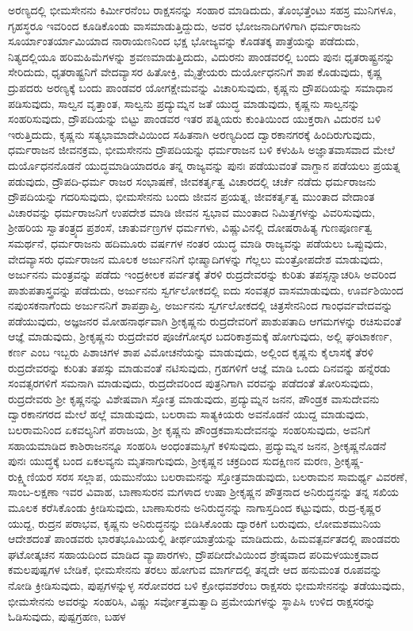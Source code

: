 ಅರಣ್ಯದಲ್ಲಿ ಭೀಮಸೇನನು ಕಿರ್ಮೀರನೆಂಬ ರಾಕ್ಷಸನನ್ನು ಸಂಹಾರ ಮಾಡಿದುದು, ತೊಂಭತ್ತೆಂಟು ಸಹಸ್ರ ಮುನಿಗಳೂ, ಗೃಹಸ್ಥರೂ ಇವರಿಂದ ಕೂಡಿಕೊಂಡು ವಾಸಮಾಡು\-ತ್ತಿದ್ದುದು, ಅವರ ಭೋಜನಾದಿಗಳಿಗಾಗಿ ಧರ್ಮರಾಜನು ಸೂರ್ಯಾಂತರ್ಯಾಮಿಯಾದ ನಾರಾಯಣನಿಂದ ಭಕ್ಷ ಭೋಜ್ಯವನ್ನು ಕೊಡತಕ್ಕ ಪಾತ್ರೆಯನ್ನು ಪಡೆದುದು, ನಿತ್ಯದಲ್ಲಿಯೂ ಹರಿಮಹಿಮೆಗಳನ್ನು ಶ್ರವಣಮಾಡುತ್ತಿದುದು, ವಿದುರನು ಪಾಂಡವರಲ್ಲಿ ಬಂದು ಪುನಃ ಧೃತರಾಷ್ಟ್ರನನ್ನು ಸೇರಿದುದು, ಧೃತರಾಷ್ಟ್ರನಿಗೆ ವೇದವ್ಯಾಸರ ಹಿತೋಕ್ತಿ, ಮೈತ್ರೇಯರು ದುರ್ಯೋಧನನಿಗೆ ಶಾಪ ಕೊಡುವುದು, ಕೃಷ್ಣ ದ್ರುಪದರು ಅರಣ್ಯಕ್ಕೆ ಬಂದು ಪಾಂಡವರ ಯೋಗಕ್ಷೇಮವನ್ನು ವಿಚಾರಿಸುವುದು, ಕೃಷ್ಣನು ದ್ರೌಪದಿಯನ್ನು ಸಮಾಧಾನ ಪಡಿಸುವುದು, ಸಾಲ್ವನ ವೃತ್ತಾಂತ, ಸಾಲ್ವನು ಪ್ರದ್ಯುಮ್ನನ ಜತೆ ಯುದ್ಧ ಮಾಡುವುದು, ಕೃಷ್ಣನು ಸಾಲ್ವನನ್ನು ಸಂಹರಿಸುವುದು, ದ್ರೌಪದಿಯನ್ನು ಬಿಟ್ಟು ಪಾಂಡವರ ಇತರ ಪತ್ನಿಯರು ಕುಂತಿಯಿಂದ ಯುಕ್ತರಾಗಿ ವಿದುರನ ಬಳಿ ಇರುತ್ತಿದುದು, ಕೃಷ್ಣನು ಸತ್ಯಭಾಮಾದೇವಿಯಿಂದ ಸಹಿತನಾಗಿ ಅರಣ್ಯದಿಂದ ದ್ವಾರಕಾನಗರಕ್ಕೆ ಹಿಂದಿರುಗುವುದು, ಧರ್ಮರಾಜನ ಜೀವನಕ್ರಮ, ಭೀಮಸೇನನು ದ್ರೌಪದಿಯನ್ನು ಧರ್ಮರಾಜನ ಬಳಿ ಕಳುಹಿಸಿ ಅಜ್ಞಾತವಾಸವಾದ ಮೇಲೆ ದುರ್ಯೊಧನನೊಡನೆ ಯುದ್ಧಮಾಡಿಯಾದರೂ ತನ್ನ ರಾಜ್ಯವನ್ನು ಪುನಃ ಪಡೆಯುವಂತೆ ವಾಗ್ದಾನ ಪಡೆಯಲು ಪ್ರಯತ್ನ ಪಡುವುದು, ದ್ರೌಪದಿ-ಧರ್ಮ ರಾಜರ ಸಂಭಾಷಣೆ, ಜೀವಕರ್ತೃತ್ವ ವಿಚಾರದಲ್ಲಿ ಚರ್ಚೆ ನಡೆದು ಧರ್ಮರಾಜನು ದ್ರೌಪದಿಯನ್ನು ಗದರಿಸುವುದು, ಭೀಮಸೇನನು ಬಂದು ಜೀವನ ಪ್ರಯತ್ನ, ಜೀವಕರ್ತೃತ್ವ ಮುಂತಾದ ವೇದಾಂತ ವಿಚಾರವನ್ನು ಧರ್ಮರಾಜನಿಗೆ ಉಪದೇಶ ಮಾಡಿ ಜೀವನ ಸ್ವಭಾವ ಮುಂತಾದ ನಿಮಿತ್ತಗಳನ್ನು ವಿವರಿಸುವುದು, ಶ‍್ರೀಹರಿಯ ಸ್ವಾತಂತ್ರ್ಯದ ಪ್ರಶಂಸೆ, ಚಾತುರ್ವಣ್ರಗಳ ಧರ್ಮಗಳು, ವಿಷ್ಣುವಿನಲ್ಲಿ ದೋಷರಾಹಿತ್ಯ ಗುಣಪೂರ್ಣತ್ವ ಸಮರ್ಥನೆ, ಧರ್ಮರಾಜನು ಹದಿಮೂರು ವರ್ಷಗಳ ನಂತರ ಯುದ್ಧ ಮಾಡಿ ರಾಜ್ಯವನ್ನು ಪಡೆಯಲು ಒಪ್ಪುವುದು, ವೇದವ್ಯಾಸರು ಧರ್ಮರಾಜನ ಮೂಲಕ ಅರ್ಜುನನಿಗೆ ಭೀಷ್ಮಾದಿಗಳನ್ನು ಗೆಲ್ಲಲು ಮಂತ್ರೋಪದೇಶ ಮಾಡುವುದು, ಅರ್ಜುನನು ಮಂತ್ರವನ್ನು ಪಡೆದು ಇಂದ್ರಕೀಲಕ ಪರ್ವತಕ್ಕೆ ತೆರಳಿ ರುದ್ರದೇವರನ್ನು ಕುರಿತು ತಪಸ್ಸನ್ನಾಚರಿಸಿ ಅವರಿಂದ ಪಾಶುಪತಾಸ್ತ್ರವನ್ನು ಪಡೆದುದು, ಅರ್ಜುನನು ಸ್ವರ್ಗಲೋಕದಲ್ಲಿ ಐದು ಸಂವತ್ಸರ ವಾಸಮಾಡುವುದು, ಊರ್ವಶಿಯಿಂದ ನಪುಂಸಕನಾಗೆಂದು ಅರ್ಜುನನಿಗೆ ಶಾಪಪ್ರಾಪ್ತಿ, ಅರ್ಜುನನು ಸ್ವರ್ಗಲೋಕದಲ್ಲಿ ಚಿತ್ರಸೇನನಿಂದ ಗಾಂಧರ್ವವೇದವನ್ನು ಪಡೆಯುವುದು, ಅಜ್ಞಜನರ ಮೋಹನಾರ್ಥವಾಗಿ ಶ‍್ರೀಕೃಷ್ಣನು ರುದ್ರದೇವರಿಗೆ ಪಾಶುಪತಾದಿ ಆಗಮಗಳನ್ನು ರಚಿಸುವಂತೆ ಆಜ್ಞೆ ಮಾಡುವುದು, ಶ‍್ರೀಕೃಷ್ಣನು ರುದ್ರದೇವರ ಪೂಜೆಗೋಸ್ಕರ ಬದರಿಕಾಶ್ರಮಕ್ಕೆ ಹೋಗುವುದು, ಅಲ್ಲಿ ಘಂಟಾಕರ್ಣ, ಕರ್ಣ ಎಂಬ ಇಬ್ಬರು ಪಿಶಾಚಿಗಳ ಶಾಪ ವಿಮೋಚನೆಯನ್ನು ಮಾಡುವುದು, ಅಲ್ಲಿಂದ ಕೃಷ್ಣನು ಕೈಲಾಸಕ್ಕೆ ತೆರಳಿ ರುದ್ರದೇವರನ್ನು ಕುರಿತು ತಪಸ್ಸು ಮಾಡುವಂತೆ ನಟಿಸುವುದು, ಗ್ರಹಗಳಿಗೆ ಆಜ್ಞೆ ಮಾಡಿ ಒಂದು ದಿನವನ್ನು ಹನ್ನೆರಡು ಸಂವತ್ಸರಗಳಿಗೆ ಸಮನಾಗಿ ಮಾಡುವುದು, ರುದ್ರದೇವರಿಂದ ಪುತ್ರನಿಗಾಗಿ ವರವನ್ನು ಪಡೆದಂತೆ ತೋರಿಸುವುದು, ರುದ್ರದೇವರು ಶ‍್ರೀ ಕೃಷ್ಣನನ್ನು ವಿಶೇಷವಾಗಿ ಸ್ತೋತ್ರ ಮಾಡುವುದು, ಪ್ರದ್ಯುಮ್ನನ ಜನನ, ಪೌಂಡ್ರಕ ವಾಸುದೇವನು ದ್ವಾರಕಾನಗರದ ಮೇಲೆ ಹಲ್ಲೆ ಮಾಡುವುದು, ಬಲರಾಮ ಸಾತ್ಯಕಿಯರು ಅವನೊಡನೆ ಯುದ್ದ ಮಾಡುವುದು, ಬಲರಾಮನಿಂದ ಏಕವಲ್ಯನಿಗೆ ಪರಾಜಯ, ಶ‍್ರೀ ಕೃಷ್ಣನು ಪೌಂಡ್ರಕವಾಸುದೇವನನ್ನು ಸಂಹರಿಸುವುದು, ಅವನಿಗೆ ಸಹಾಯಮಾಡಿದ ಕಾಶಿರಾಜನನ್ನೂ ಸಂಹರಿಸಿ ಅಂಧಂತಮಸ್ಸಿಗೆ ಕಳಿಸುವುದು, ಪ್ರದ್ಯುಮ್ನನ ಜನನ, ಶ‍್ರೀಕೃಷ್ಣನೊಡನೆ ಪುನಃ ಯುದ್ಧಕ್ಕೆ ಬಂದ ಏಕಲವ್ಯನು ಮೃತನಾಗುವುದು, ಶ‍್ರೀಕೃಷ್ಣನ ಚಕ್ರದಿಂದ ಸುದಕ್ಷಿಣನ ಮರಣ, ಶ‍್ರೀಕೃಷ್ಣ-ರುಕ್ಷ್ಮಿಣಿಯರ ಸರಸ ಸಲ್ಲಾಪ, ಯಮುನೆಯು ಬಲರಾಮನನ್ನು ಸ್ತೋತ್ರಮಾಡುವುದು, ಬಲರಾಮನ ಸಾಮರ್ಥ್ಯ ವಿವರಣೆ, ಸಾಂಬ-ಲಕ್ಷಣಾ ಇವರ ವಿವಾಹ, ಬಾಣಾಸುರನ ಮಗಳಾದ ಉಷಾ ಶ‍್ರೀಕೃಷ್ಣನ ಪೌತ್ರನಾದ ಅನಿರುದ್ಧನನ್ನು ತನ್ನ ಸಖಿಯ ಮೂಲಕ ಕರೆಸಿಕೊಂಡು ಕ್ರೀಡಿಸುವುದು, ಬಾಣಾಸುರನು ಅನಿರುದ್ಧನನ್ನು ನಾಗಾಸ್ತದಿಂದ ಕಟ್ಟುವುದು, ರುದ್ರ-ಕೃಷ್ಣರ ಯುದ್ದ, ರುದ್ರನ ಪರಾಭವ, ಕೃಷ್ಣನು ಅನಿರುದ್ಧನನ್ನು ಬಿಡಿಸಿಕೊಂಡು ದ್ವಾರಕಿಗೆ ಬರುವುದು, ಲೋಮಶಮುನಿಯ ಆದೇಶದಂತೆ ಪಾಂಡವರು ಭಾರತಭೂಮಿಯಲ್ಲಿ ತೀರ್ಥಯಾತ್ರೆಯನ್ನು ಮಾಡಿದುದು, ಹಿಮವತ್ಪರ್ವತದಲ್ಲಿ ಪಾಂಡವರು ಘಟೋತ್ಕಚನ ಸಹಾಯದಿಂದ ಮಾಡಿದ ವ್ಯಾಪಾರಗಳು, ದ್ರೌಪದೀದೇವಿಯಿಂದ ಶ್ರೇಷ್ಠವಾದ ಪರಿಮಳಯುಕ್ತವಾದ ಕಮಲಪುಷ್ಪಗಳ ಬೇಡಿಕೆ, ಭೀಮಸೇನನು ತರಲು ಹೋಗುವ ಮಾರ್ಗದಲ್ಲಿ ತನ್ನದೇ ಆದ ಹನುಮಂತ ರೂಪವನ್ನು ನೋಡಿ ಕ್ರೀಡಿಸುವುದು, ಪುಪ್ಪಗಳನ್ನುಳ್ಳ ಸರೋವರದ ಬಳಿ ಕ್ರೋಧವಶರೆಂಬ ರಾಕ್ಷಸರು ಭೀಮಸೇನನನ್ನು ತಡೆಯುವುದು, ಭೀಮಸೇನನು ಅವರನ್ನು ಸಂಹರಿಸಿ, ವಿಷ್ಣು ಸರ್ವೋತ್ತಮತ್ವಾದಿ ಪ್ರಮೇಯಗಳನ್ನು ಸ್ಥಾಪಿಸಿ ಉಳಿದ ರಾಕ್ಷಸರನ್ನು ಓಡಿಸುವುದು, ಪುಷ್ಪಗ್ರಹಣ, ಬಹಳ 